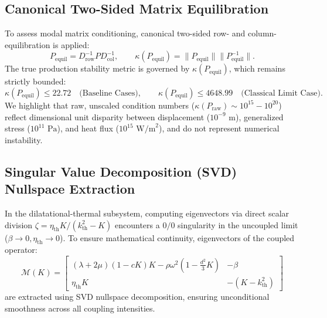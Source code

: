 \documentclass[11pt,a4paper]{article}
\begin{document}
\subsection{Canonical Two-Sided Matrix Equilibration}
To assess modal matrix conditioning, canonical two-sided row- and column-equilibration is applied:
\begin{equation}
P_{\text{equil}} = D_{\text{row}}^{-1} P D_{\text{col}}^{-1}, \qquad \kappa(P_{\text{equil}}) = \|P_{\text{equil}}\| \|P_{\text{equil}}^{-1}\|.
\label{eq:equilibration}
\end{equation}
The true production stability metric is governed by $\kappa(P_{\text{equil}})$, which remains strictly bounded:
\begin{equation}
\kappa(P_{\text{equil}}) \le 22.72 \quad \text{(Baseline Cases)}, \qquad \kappa(P_{\text{equil}}) \le 4648.99 \quad \text{(Classical Limit Case)}.
\end{equation}
We highlight that raw, unscaled condition numbers ($\kappa(P_{\text{raw}}) \sim 10^{15} - 10^{20}$) reflect dimensional unit disparity between displacement ($10^{-9}\text{ m}$), generalized stress ($10^{11}\text{ Pa}$), and heat flux ($10^{15}\text{ W/m}^2$), and do not represent numerical instability.

\subsection{Singular Value Decomposition (SVD) Nullspace Extraction}
In the dilatational-thermal subsystem, computing eigenvectors via direct scalar division $\zeta = \eta_{\text{th}} K / (k_{\text{th}}^2 - K)$ encounters a $0/0$ singularity in the uncoupled limit ($\beta \to 0, \eta_{\text{th}} \to 0$). To ensure mathematical continuity, eigenvectors of the coupled operator:
\begin{equation}
\mathcal{M}(K) = \begin{bmatrix}
(\lambda+2\mu)(1 - c K) K - \rho\omega^2(1 - \frac{d^2}{3}K) & -\beta \\
\eta_{\text{th}} K & -(K - k_{\text{th}}^2)
\end{bmatrix}
\end{equation}
are extracted using SVD nullspace decomposition, ensuring unconditional smoothness across all coupling intensities.
\end{document}

